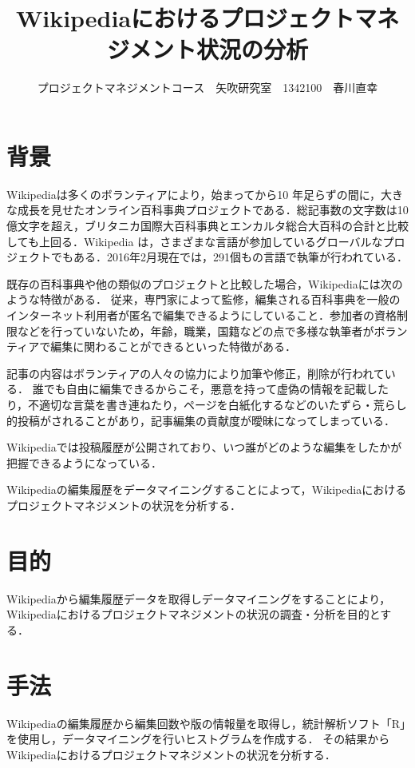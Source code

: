 \documentclass[uplatex,twocolumn,dvipdfmx]{jsarticle}
\title{\vspace{-5mm}\fontsize{14pt}{0pt}\selectfont Wikipediaにおけるプロジェクトマネジメント状況の分析}
\author{\normalsize プロジェクトマネジメントコース　矢吹研究室　1342100　春川直幸}
\date{}
\begin{document}
\fontsize{10.5pt}{\baselineskip}\selectfont
\maketitle


\section{背景}

Wikipediaは多くのボランティアにより，始まってから10 年足らずの間に，大きな成長を見せたオンライン百科事典プロジェクトである．総記事数の文字数は10 億文字を超え，ブリタニカ国際大百科事典とエンカルタ総合大百科の合計と比較しても上回る．Wikipedia は，さまざまな言語が参加しているグローバルなプロジェクトでもある\cite{wikirevo}．2016年2月現在では，291個もの言語で執筆が行われている．

既存の百科事典や他の類似のプロジェクトと比較した場合，Wikipediaには次のような特徴がある．
従来，専門家によって監修，編集される百科事典を一般のインターネット利用者が匿名で編集できるようにしていること．参加者の資格制限などを行っていないため，年齢，職業，国籍などの点で多様な執筆者がボランティアで編集に関わることができるといった特徴がある\cite{wiki}．

記事の内容はボランティアの人々の協力により加筆や修正，削除が行われている\cite{hensyuu}．
誰でも自由に編集できるからこそ，悪意を持って虚偽の情報を記載したり，不適切な言葉を書き連ねたり，ページを白紙化するなどのいたずら・荒らし的投稿がされることがあり，記事編集の貢献度が曖昧になってしまっている\cite{wiki}．

Wikipediaでは投稿履歴が公開されており、いつ誰がどのような編集をしたかが把握できるようになっている\cite{wiki}．

Wikipediaの編集履歴をデータマイニングすることによって，Wikipediaにおけるプロジェクトマネジメントの状況を分析する．

\section{目的}

Wikipediaから編集履歴データを取得しデータマイニングをすることにより，Wikipediaにおけるプロジェクトマネジメントの状況の調査・分析を目的とする．

\section{手法}

Wikipediaの編集履歴から編集回数や版の情報量を取得し，統計解析ソフト「R」を使用し，データマイニングを行いヒストグラムを作成する．
その結果からWikipediaにおけるプロジェクトマネジメントの状況を分析する．
\end{document}
